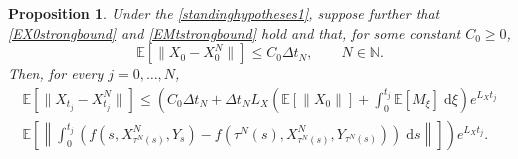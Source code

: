 \documentclass[reqno,12pt]{amsart}
\theoremstyle{plain} %
\newtheorem{proposition}{Proposition}[section]
\theoremstyle{definition} %
\begin{document}
\begin{proposition}
    \label{propbasicestimate}
    Under the \cref{standinghypotheses1}, suppose further that \eqref{EX0strongbound} and \eqref{EMtstrongbound} hold and that, for some constant $C_0 \geq 0$, 
    \begin{equation}
        \label{EX0X0N}
        \mathbb{E}[\|X_0 - X_0^N\|] \leq C_0 \Delta t_N, \qquad N\in \mathbb{N}.
    \end{equation}
    Then, for every $j = 0, \ldots, N$,
    \begin{multline}
        \label{expectedestimateglobalerrorintegral}
            \mathbb{E} \left[\|X_{t_j} - X_{t_j}^N\|\right] \leq \left( C_0 \Delta t_N + \Delta t_N L_X \left(\mathbb{E}[\|X_0\|] + \int_0^{t_j} \mathbb{E}[M_\xi]\;\mathrm{d}\xi\right)e^{L_X t_j}\right. \\
            \left. \mathbb{E}\left[\left\|\int_0^{t_j} \left( f(s, X_{\tau^N(s)}^N, Y_s) - f(\tau^N(s), X_{\tau^N(s)}^N, Y_{\tau^N(s)}) \right)\;\mathrm{d}s\right\|\right]\right) e^{L_X t_j}.
    \end{multline}
\end{proposition}
\end{document}
